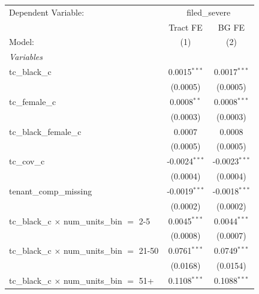 \begin{tabular}{lcc}
   \tabularnewline \midrule \midrule
   Dependent Variable: & \multicolumn{2}{c}{filed\_severe}\\
                                                         & Tract FE                & BG FE \\   
   Model:                                                & (1)                     & (2)\\  
   \midrule
   \emph{Variables}\\
   tc\_black\_c                                          & 0.0015$^{***}$          & 0.0017$^{***}$\\   
                                                         & (0.0005)                & (0.0005)\\   
   tc\_female\_c                                         & 0.0008$^{**}$           & 0.0008$^{***}$\\   
                                                         & (0.0003)                & (0.0003)\\   
   tc\_black\_female\_c                                  & 0.0007                  & 0.0008\\   
                                                         & (0.0005)                & (0.0005)\\   
   tc\_cov\_c                                            & -0.0024$^{***}$         & -0.0023$^{***}$\\   
                                                         & (0.0004)                & (0.0004)\\   
   tenant\_comp\_missing                                 & -0.0019$^{***}$         & -0.0018$^{***}$\\   
                                                         & (0.0002)                & (0.0002)\\   
   tc\_black\_c $\times$ num\_units\_bin $=$ 2-5         & 0.0045$^{***}$          & 0.0044$^{***}$\\   
                                                         & (0.0008)                & (0.0007)\\   
   tc\_black\_c $\times$ num\_units\_bin $=$ 21-50       & 0.0761$^{***}$          & 0.0749$^{***}$\\   
                                                         & (0.0168)                & (0.0154)\\   
   tc\_black\_c $\times$ num\_units\_bin $=$ 51+         & 0.1108$^{***}$          & 0.1088$^{***}$\\   

\end{tabular}
